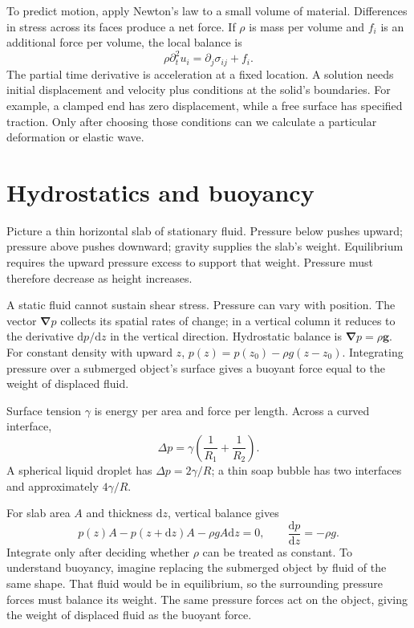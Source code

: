 \documentclass[11pt,oneside]{book}
\newcommand{\dd}{\mathrm{d}}
\newcommand{\vect}[1]{\boldsymbol{#1}}
\newcommand{\grad}{\boldsymbol{\nabla}}
\newcommand{\od}[2]{\frac{\dd #1}{\dd #2}}
\theoremstyle{reviewstyle}
\begin{document}
To predict motion, apply Newton's law to a small volume of material. Differences in stress across its faces produce a net force. If $\rho$ is mass per volume and $f_i$ is an additional force per volume, the local balance is
\begin{equation}
\rho\partial_t^2u_i=\partial_j\sigma_{ij}+f_i.
\end{equation}
The partial time derivative is acceleration at a fixed location. A solution needs initial displacement and velocity plus conditions at the solid's boundaries. For example, a clamped end has zero displacement, while a free surface has specified traction. Only after choosing those conditions can we calculate a particular deformation or elastic wave.

\section{Hydrostatics and buoyancy}
Picture a thin horizontal slab of stationary fluid. Pressure below pushes upward; pressure above pushes downward; gravity supplies the slab's weight. Equilibrium requires the upward pressure excess to support that weight. Pressure must therefore decrease as height increases.

A static fluid cannot sustain shear stress. Pressure can vary with position. The vector $\grad p$ collects its spatial rates of change; in a vertical column it reduces to the derivative $\dd p/\dd z$ in the vertical direction. Hydrostatic balance is
$\grad p=\rho\vect g$. For constant density with upward $z$, $p(z)=p(z_0)-\rho g(z-z_0)$. Integrating pressure over a submerged object's surface gives a buoyant force equal to the weight of displaced fluid.

Surface tension $\gamma$ is energy per area and force per length. Across a curved interface,
\begin{equation}
\Delta p=\gamma\left(\frac{1}{R_1}+\frac{1}{R_2}\right).
\end{equation}
A spherical liquid droplet has $\Delta p=2\gamma/R$; a thin soap bubble has two interfaces and approximately $4\gamma/R$.

For slab area $A$ and thickness $\dd z$, vertical balance gives
\begin{equation}
p(z)A-p(z+\dd z)A-\rho gA\dd z=0,
\qquad \od pz=-\rho g.
\end{equation}
Integrate only after deciding whether $\rho$ can be treated as constant. To understand buoyancy, imagine replacing the submerged object by fluid of the same shape. That fluid would be in equilibrium, so the surrounding pressure forces must balance its weight. The same pressure forces act on the object, giving the weight of displaced fluid as the buoyant force.
\end{document}
